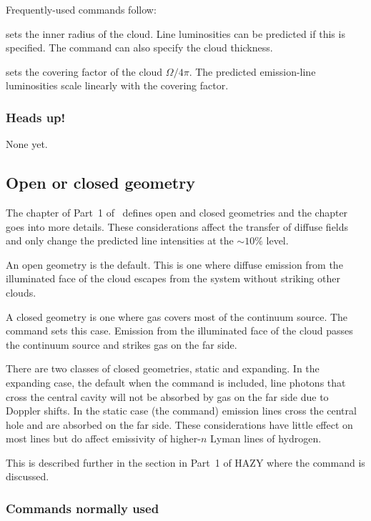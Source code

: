 \documentclass[12pt,twoside]{article}
\begin{document}
{Frequently-used commands follow:

 sets the inner radius
of the cloud.  Line luminosities can be
predicted if this is specified.  The command can also specify the cloud
thickness.

 sets the covering factor of the cloud
$\Omega/4\pi$.  The
predicted emission-line luminosities scale linearly with the covering factor.

\subsubsection{Heads up!}

   None yet.

\subsection{Open or closed geometry}

   The chapter  of Part~1 of \Hazy\ defines open and closed
geometries and the chapter  goes into more details.  These
considerations affect the transfer of diffuse fields and only change the
predicted line intensities at the $\sim 10\%$ level.

   An open geometry is the default.  This is one where diffuse emission
from the illuminated face of the cloud escapes from the system without
striking other clouds.

   A closed geometry is one where gas covers most of the continuum source.
The  command sets this case.
Emission from the illuminated face of
the cloud passes the continuum source and strikes gas on the far side.

There are two classes of closed geometries, static and expanding.  In
the expanding case, the default when the  command is included,
line photons that cross the central cavity will not be absorbed
by gas on the far side due to Doppler shifts.  In the static case (the
 command) emission lines
cross the central hole and are absorbed on
the far side.  These considerations have little effect on most lines but
do affect emissivity of higher-$n$ Lyman lines of hydrogen.

This is described further in the section in Part~1 of HAZY where the
 command is discussed.

\subsubsection{Commands normally used}

}
\end{document}
